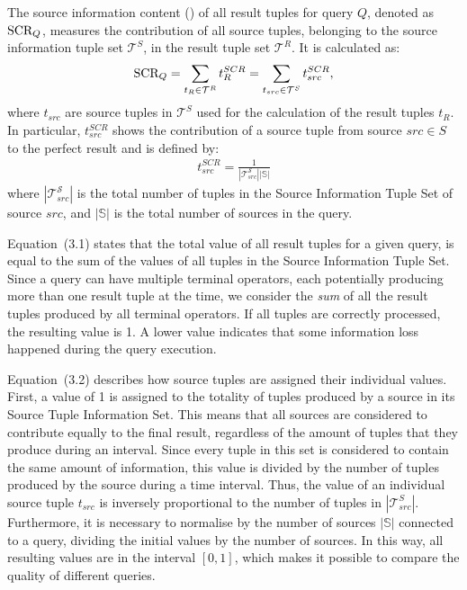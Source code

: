 \begin{definition} {
The source information content (\sic) of all result tuples for query $Q$, 
denoted as $\textrm{SCR}_Q$, measures the contribution of all source tuples, belonging to the source
information tuple set $\mathcal{T}^{S}$, in the result tuple set $\mathcal{T}^R$. It is calculated as: 
\begin{align} 
		\textrm{SCR}_Q = \sum_{t_R \in \mathcal{T}^R} t_{R}^{SCR} = \sum_{t_{src} \in \mathcal{T}^{S}}
		t_{src}^{SCR},
\end{align}
where $t_{src}$ are source tuples in $\mathcal{T}^{S}$ used for the calculation of the
result tuples $t_{R}$. In particular, $t_{src}^{SCR}$ shows the contribution of a source tuple from 
source ${src\in\xspace S}$ to the perfect result and is defined by:
\begin{align}
		t^{SCR}_{src} = \frac{1}{|\mathcal{T}_{src}^{\mathcal{S}}||\mathbb{S}|}
\end{align} 
where $|\mathcal{T}_{src}^{\mathcal{S}}|$ is the total number of tuples in the Source Information Tuple
Set of source $src$, and $|\mathbb{S}|$ is the total number of sources in the query. }
\end{definition}
\vspace{-5pt}
Equation~(3.1) states that the total \sic value of all result tuples for a given query, is equal to the
sum of the \sic values of all tuples in the Source Information Tuple Set. 
Since a query can have multiple terminal operators, each potentially producing more than one result
tuple at the time, we consider the \emph{sum} of all the result tuples produced by all terminal
operators.
If all tuples are correctly processed, the
resulting \sic value is 1. A lower value indicates that some information loss happened
during the query execution.

Equation~(3.2) describes how source tuples are assigned their individual \sic values. First, a value of 1
is assigned to the totality of tuples produced by a source in its Source Tuple Information Set. This
means that all sources are considered to contribute equally to the final result, regardless of the amount
of tuples that they produce during an interval.
Since every tuple in this set is considered to contain the same amount of information, this value is
divided by the number of tuples produced by the source during a time interval.
Thus, the \sic value of an individual source tuple $t_{src}$ is inversely proportional to the number of
tuples in $|\mathcal{T}_{src}^{S}|$. Furthermore, it is necessary to normalise by the number of sources
$|\mathbb{S}|$ connected to a query, dividing the initial \sic values by the number of sources.
In this way, all resulting \sic values are in the interval $[0,1]$, which makes it possible to compare
the quality of different queries.
\vspace{-10pt}
